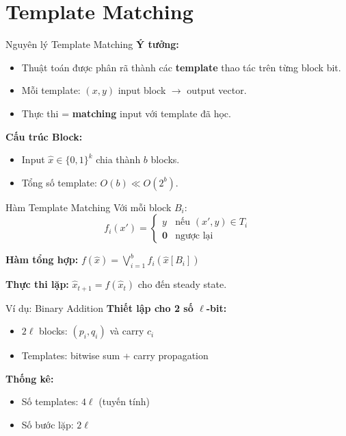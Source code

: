 \section{Template Matching}

\begin{frame}{Nguyên lý Template Matching}
  \textbf{Ý tưởng:}
  \begin{itemize}
    \item Thuật toán được phân rã thành các \textbf{template} thao tác trên từng block bit.
    \item Mỗi template: $(x, y)$ input block $\to$ output vector.
    \item Thực thi = \textbf{matching} input với template đã học.
  \end{itemize}

  \vspace{0.3cm}
  \textbf{Cấu trúc Block:}
  \begin{itemize}
    \item Input $\hat{x} \in \{0,1\}^k$ chia thành $b$ blocks.
    \item Tổng số template: $O(b) \ll O(2^b)$.
  \end{itemize}
\end{frame}

\begin{frame}{Hàm Template Matching}
  Với mỗi block $B_i$:
  \[
    f_i(x') = \begin{cases} y & \text{nếu } (x', y) \in T_i \\ \mathbf{0} & \text{ngược lại} \end{cases}
  \]

  \textbf{Hàm tổng hợp:} $f(\hat{x}) = \bigvee_{i=1}^{b} f_i(\hat{x}[B_i])$
  
  \vspace{0.3cm}
  \textbf{Thực thi lặp:} $\hat{x}_{t+1} = f(\hat{x}_t)$ cho đến steady state.
\end{frame}

\begin{frame}{Ví dụ: Binary Addition}
  \textbf{Thiết lập cho 2 số $\ell$-bit:}
  \begin{itemize}
    \item $2\ell$ blocks: $(p_i, q_i)$ và carry $c_i$
    \item Templates: bitwise sum + carry propagation
  \end{itemize}

  \vspace{0.3cm}
  \textbf{Thống kê:}
  \begin{itemize}
    \item Số templates: $4\ell$ (tuyến tính)
    \item Số bước lặp: $2\ell$
  \end{itemize}
\end{frame}

